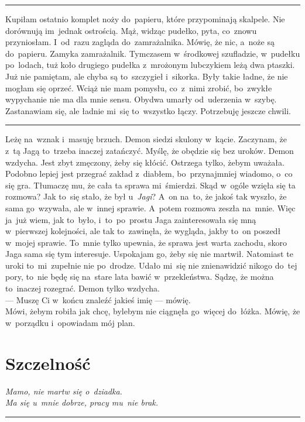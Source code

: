 \documentclass[9pt, a5paper]{memoir}
\begin{document}
\fancybreak{* \quad * \quad *}

Kupiłam ostatnio komplet noży do~papieru, które przypominają skalpele. Nie dorównują im~jednak ostrością. Mąż, widząc pudełko, pyta, co~znowu przyniosłam. I~od~razu zagląda do~zamrażalnika. Mówię, że nic, a~noże są do~papieru. Zamyka zamrażalnik. Tymczasem w~środkowej szufladzie, w~pudełku po~lodach, tuż koło drugiego pudełka z~mrożonym lubczykiem leżą dwa ptaszki. Już nie pamiętam, ale chyba są to~szczygieł i~sikorka. Były takie ładne, że nie mogłam się oprzeć. Wciąż nie mam pomysłu, co~z~nimi zrobić, bo~zwykłe wypychanie nie ma dla mnie sensu. Obydwa umarły od~uderzenia w~szybę. Zastanawiam się, ale ładnie mi~się to~wszystko łączy. Potrzebuję jeszcze chwili.

\fancybreak{* \quad * \quad *}

Leżę na~wznak i~masuję brzuch. Demon siedzi skulony w~kącie. Zaczynam, że z~tą Jagą to~trzeba inaczej zatańczyć. Myślę, że obędzie się bez uroków. Demon wzdycha. Jest zbyt zmęczony, żeby się kłócić. Ostrzega tylko, żebym uważała. Podobno lepiej jest przegrać zakład z~diabłem, bo~przynajmniej wiadomo, o~co się gra. Tłumaczę mu, że cała ta sprawa mi~śmierdzi. Skąd w~ogóle wzięła się ta rozmowa? Jak to~się stało, że był u~\textit{Jagi}? A~on na~to, że jakoś tak wyszło, że sama go~wzywała, ale w~innej sprawie. A~potem rozmowa zeszła na~mnie. Więc ja~już wiem, jak to~było, i~to~po~prostu Jaga zainteresowała się mną w~pierwszej kolejności, ale tak to~zawinęła, że wygląda, jakby to~on poszedł w~mojej sprawie. To~mnie tylko upewnia, że sprawa jest warta zachodu, skoro Jaga sama się tym interesuje. Uspokajam go, żeby się nie martwił. Natomiast te uroki to~mi~zupełnie nie po~drodze. Udało mi~się nie znienawidzić nikogo do~tej pory, to~nie będę się na~stare lata bawić w~przekleństwa. Sądzę, że można to~inaczej rozegrać. Demon tylko wzdycha.\\
--- Muszę Ci w~końcu znaleźć jakieś imię --- mówię.\\
Mówi, żebym robiła jak chcę, bylebym nie ciągnęła go~więcej do~łóżka. Mówię, że w~porządku i~opowiadam mój plan.

\newpage
\section{Szczelność}
{
\itshape
Mamo, nie martw się o~dziadka.\\
Ma się u~mnie dobrze, pracy mu~nie brak.
}

\fancybreak{* \quad * \quad *}
\end{document}
